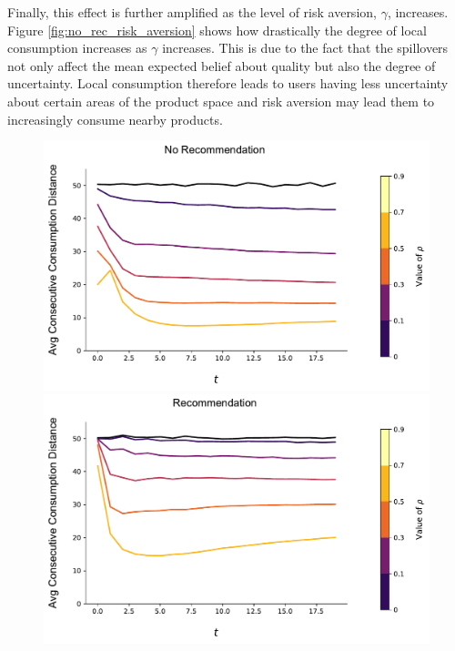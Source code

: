 \documentclass[sigconf, anonymous, review]{acmart}
\begin{document}
Finally, this effect is further amplified as the level of risk aversion, $\gamma$, increases. Figure \ref{fig:no_rec_risk_aversion} shows how drastically the degree of local consumption increases as $\gamma$ increases. This is due to the fact that the spillovers not only affect the mean expected belief about quality but also the degree of uncertainty. Local consumption therefore leads to users having less uncertainty about certain areas of the product space and risk aversion may lead them to increasingly consume nearby products.

\begin{figure}[t]
\includegraphics[width=\linewidth]{figures/rho_consumption_dist_N_200T_20.pdf}\\
\includegraphics[width=\linewidth]{figures/rho_consumption_dist_N_200T_20_partial.pdf}\\

\end{figure}
\end{document}
